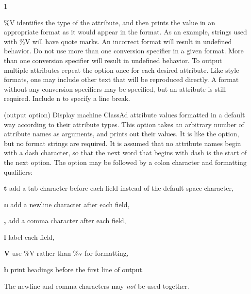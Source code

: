 \begin{ManPage}{\label{man-condor-q}}{1}
\begin{Options}
{    \%V identifies the type of the attribute,
    and then prints the value in an appropriate format as it would
    appear in the  format.
    As an example, strings used with \%V will have quote marks.
    An incorrect format will result in undefined behavior.
    Do not use more than one conversion specifier in a given
    format.  More than one conversion specifier will result
    in undefined behavior.  To output multiple attributes
    repeat the  option once for each desired attribute.
    Like {} style formats, one may include other
    text that will be reproduced directly.   
    A format without any conversion specifiers may be specified,
    but an attribute is still required.
    Include \Bs n to specify a line break. }

   {
    (output option) Display machine ClassAd attribute values 
    formatted in a default way according to their attribute types.  
    This option takes an arbitrary number of attribute names as arguments,
    and prints out their values.  It is like the  option,
    but no format strings are required.
    It is assumed that no attribute names begin with a dash character,
    so that the next word that begins with dash is the 
    start of the next option.
    The  option may be followed by a colon character
    and formatting qualifiers:

    \textbf{t} add a tab character before each field instead of 
    the default space character,

    \textbf{n} add a newline character after each field,

    \textbf{,} add a comma character after each field,

    \textbf{l} label each field,

    \textbf{V} use \%V rather than \%v for formatting,

    \textbf{h} print headings before the first line of output.

    The newline and comma characters may \emph{not} be used together.
    }
\end{Options}
\end{ManPage}
